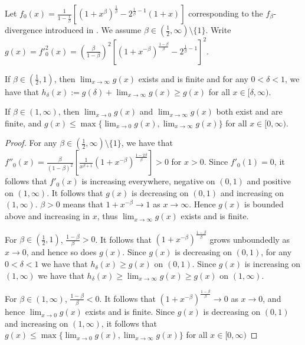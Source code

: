 \begin{lemma}\label{lemma:upper-bound-f-beta}
Let $f_0(x) = \frac{1}{1-\frac{1}{\beta}}\left[ \left(1+x^\beta\right)^\frac{1}{\beta}  - 2^{\frac{1}{\beta} - 1}(1+x)\right]$
corresponding to the ${f_\beta}$-divergence introduced in \cite{osterreicher2003new}.
We assume $\beta \in \left( \frac{1}{2}, \infty\right) \setminus \{1\}$.
Write $g(x) = f'^2_0(x) = \left(\frac{\beta}{1-\beta}\right)^2\left[ \left(1+x^{-\beta}\right)^\frac{1-\beta}{\beta}  - 2^{\frac{1}{\beta} - 1}\right]^2$.

If $\beta \in \left(\frac{1}{2}, 1\right)$, then $\lim_{x\to \infty}g(x)$ exists and is finite and for any $0<\delta<1$, we have that $h_\delta(x) := g(\delta) + \lim_{x\to \infty}g(x) \geq g(x)$ for all $x\in[\delta, \infty)$.

If $\beta \in \left(1, \infty \right)$, then $\lim_{x\to0}g(x)$ and $\lim_{x\to \infty}g(x)$ both exist and are finite, and $g(x) \leq \max\{\lim_{x\to0}g(x), \lim_{x\to \infty}g(x)\}$ for all $x\in[0, \infty)$.
\end{lemma}
\begin{proof}
For any $\beta \in \left( \frac{1}{2}, \infty\right) \setminus \{1\}$, we have that $f''_0(x) = \frac{\beta}{(1-\beta)^2} \left[ 
\frac{1}{x^{\beta+1}} \left( 1 + x^{-\beta}\right)^{\frac{1-2\beta}{\beta}}\right] > 0$ for $x>0$.
Since $f'_0(1)=0$, it follows that $f'_0(x)$ is increasing everywhere, negative on $(0,1)$ and positive on $(1,\infty)$.
It follows that $g(x)$ is decreasing on $(0,1)$ and increasing on $(1,\infty)$.
$\beta > 0$ means that $1+x^{-\beta} \to 1$ as $x\to \infty$. Hence $g(x)$ is bounded above and increasing in $x$, thus $\lim_{x\to\infty} g(x)$ exists and is finite.

For $\beta \in (\frac{1}{2}, 1)$, $\frac{1-\beta}{\beta} > 0$. 
It follows that $\left(1+x^{-\beta}\right)^\frac{1-\beta}{\beta}$ grows unboundedly as $x \to 0$, and hence so does $g(x)$.
Since $g(x)$ is decreasing on $(0,1)$, for any $0<\delta<1$ we have that $h_\delta(x)\geq g(x)$ on $(0,1)$.
Since $g(x)$ is increasing on $(1, \infty)$ we have that $h_\delta(x) \geq \lim_{x\to\infty} g(x) \geq g(x)$ on $(1,\infty)$.

For $\beta \in (1, \infty)$, $\frac{1-\beta}{\beta} < 0$. 
It follows that $\left(1+x^{-\beta}\right)^\frac{1-\beta}{\beta} \to 0$ as $x \to 0$, and hence $\lim_{x\to 0}g(x)$ exists and is finite.
Since $g(x)$ is decreasing on $(0,1)$ and increasing on $(1,\infty)$, it follows that 
$g(x) \leq \max\{\lim_{x\to 0}g(x), \lim_{x\to \infty}g(x)\}$ for all $x\in [0, \infty)$

\end{proof}


